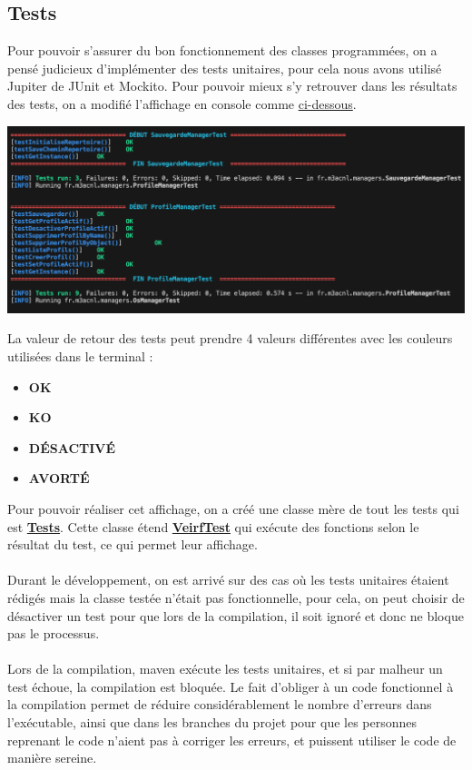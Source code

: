\subsection{Tests}
Pour pouvoir s'assurer du bon fonctionnement des classes programmées, on a pensé judicieux d'implémenter des tests unitaires, pour cela nous avons utilisé Jupiter de JUnit et Mockito. Pour pouvoir mieux s'y retrouver dans les résultats des tests, on a modifié l'affichage en console comme
\hyperlink{imgTest}{ci-dessous}.

\begin{center}
    \hypertarget{imgTest}{
        \includegraphics[width=15cm]{../Annexe/Tests.png}
    }
\end{center}
La valeur de retour des tests peut prendre 4 valeurs différentes avec les couleurs utilisées dans le terminal : 
\begin{itemize}
    \item \textbf{OK}
    \item \textbf{KO}
    \item \textbf{DÉSACTIVÉ}
    \item \textbf{AVORTÉ}
\end{itemize}

Pour pouvoir réaliser cet affichage, on a créé une classe mère de tout les tests qui est 
\href{https://github.com/Gr4-M3ACNL/hashi/blob/master/src/test/java/fr/m3acnl/Tests.java}{\textbf{Tests}}.
Cette classe étend
\href{https://github.com/Gr4-M3ACNL/hashi/blob/master/src/test/java/fr/m3acnl/VerifTest.java}{\textbf{VeirfTest}} qui exécute des fonctions selon le résultat du test, ce qui permet leur affichage.
\\\\
Durant le développement, on est arrivé sur des cas où les tests unitaires étaient rédigés mais la classe testée n'était pas fonctionnelle, pour cela, on peut choisir de désactiver un test pour que lors de la compilation, il soit ignoré et donc ne bloque pas le processus.
\\\\
Lors de la compilation, maven exécute les tests unitaires, et si par malheur un test échoue, la compilation est bloquée. Le fait d'obliger à un code fonctionnel à la compilation permet de réduire considérablement le nombre d'erreurs dans l'exécutable, ainsi que dans les branches du projet pour que les personnes reprenant le code n'aient pas à corriger les erreurs, et puissent utiliser le code de manière sereine.